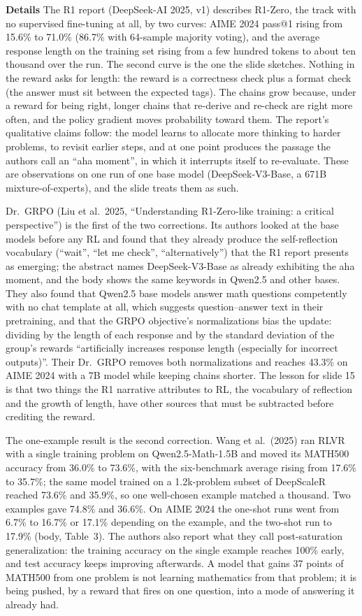 \documentclass[11pt,letterpaper]{article}
\newcommand{\para}[1]{\medskip\noindent\textbf{#1}\quad}
\begin{document}
\para{Details} The R1 report (DeepSeek-AI 2025, v1) describes R1-Zero, the track with no supervised fine-tuning at all, by two curves: AIME 2024 pass@1 rising from 15.6\% to 71.0\% (86.7\% with 64-sample majority voting), and the average response length on the training set rising from a few hundred tokens to about ten thousand over the run. The second curve is the one the slide sketches. Nothing in the reward asks for length: the reward is a correctness check plus a format check (the answer must sit between the expected tags). The chains grow because, under a reward for being right, longer chains that re-derive and re-check are right more often, and the policy gradient moves probability toward them. The report's qualitative claims follow: the model learns to allocate more thinking to harder problems, to revisit earlier steps, and at one point produces the passage the authors call an ``aha moment'', in which it interrupts itself to re-evaluate. These are observations on one run of one base model (DeepSeek-V3-Base, a 671B mixture-of-experts), and the slide treats them as such.

Dr.\ GRPO (Liu et al.\ 2025, ``Understanding R1-Zero-like training: a critical perspective'') is the first of the two corrections. Its authors looked at the base models before any RL and found that they already produce the self-reflection vocabulary (``wait'', ``let me check'', ``alternatively'') that the R1 report presents as emerging; the abstract names DeepSeek-V3-Base as already exhibiting the aha moment, and the body shows the same keywords in Qwen2.5 and other bases. They also found that Qwen2.5 base models answer math questions competently with no chat template at all, which suggests question--answer text in their pretraining, and that the GRPO objective's normalizations bias the update: dividing by the length of each response and by the standard deviation of the group's rewards ``artificially increases response length (especially for incorrect outputs)''. Their Dr.\ GRPO removes both normalizations and reaches 43.3\% on AIME 2024 with a 7B model while keeping chains shorter. The lesson for slide 15 is that two things the R1 narrative attributes to RL, the vocabulary of reflection and the growth of length, have other sources that must be subtracted before crediting the reward.

The one-example result is the second correction. Wang et al.\ (2025) ran RLVR with a single training problem on Qwen2.5-Math-1.5B and moved its MATH500 accuracy from 36.0\% to 73.6\%, with the six-benchmark average rising from 17.6\% to 35.7\%; the same model trained on a 1.2k-problem subset of DeepScaleR reached 73.6\% and 35.9\%, so one well-chosen example matched a thousand. Two examples gave 74.8\% and 36.6\%. On AIME 2024 the one-shot runs went from 6.7\% to 16.7\% or 17.1\% depending on the example, and the two-shot run to 17.9\% (body, Table~3). The authors also report what they call post-saturation generalization: the training accuracy on the single example reaches 100\% early, and test accuracy keeps improving afterwards. A model that gains 37 points of MATH500 from one problem is not learning mathematics from that problem; it is being pushed, by a reward that fires on one question, into a mode of answering it already had.
\end{document}
